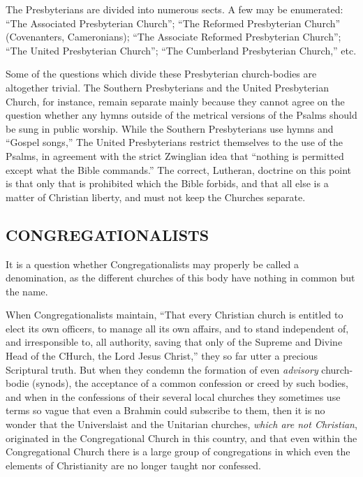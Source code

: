 \documentclass[
]{book}
\begin{document}
The Presbyterians are divided into numerous sects. A few may be enumerated: ``The Associated Presbyterian Church''; ``The Reformed Presbyterian Church'' (Covenanters, Cameronians); ``The Associate Reformed Presbyterian Church''; ``The United Presbyterian Church''; ``The Cumberland Presbyterian Church,'' etc.

Some of the questions which divide these Presbyterian church-bodies are altogether trivial. The Southern Presbyterians and the United Presbyterian Church, for instance, remain separate mainly because they cannot agree on the question whether any hymns outside of the metrical versions of the Psalms should be sung in public worship. While the Southern Presbyterians use hymns and ``Gospel songs,'' The United Presbyterians restrict themselves to the use of the Psalms, in agreement with the strict Zwinglian idea that ``nothing is permitted except what the Bible commands.'' The correct, Lutheran, doctrine on this point is that only that is prohibited which the Bible forbids, and that all else is a matter of Christian liberty, and must not keep the Churches separate.

\subsection{\texorpdfstring{CONGREGATIONALISTS}{CONGREGATIONALISTS}}\label{congregationalists}

It is a question whether Congregationalists may properly be called a denomination, as the different churches of this body have nothing in common but the name.

When Congregationalists maintain, ``That every Christian church is entitled to elect its own officers, to manage all its own affairs, and to stand independent of, and irresponsible to, all authority, saving that only of the Supreme and Divine Head of the CHurch, the Lord Jesus Christ,'' they so far utter a precious Scriptural truth. But when they condemn the formation of even \emph{advisory} church-bodie (synods), the acceptance of a common confession or creed by such bodies, and when in the confessions of their several local churches they sometimes use terms so vague that even a Brahmin could subscribe to them, then it is no wonder that the Universlaist and the Unitarian churches, \emph{which are not Christian}, originated in the Congregational Church in this country, and that even within the Congregational Church there is a large group of congregations in which even the elements of Christianity are no longer taught nor confessed.
\end{document}
